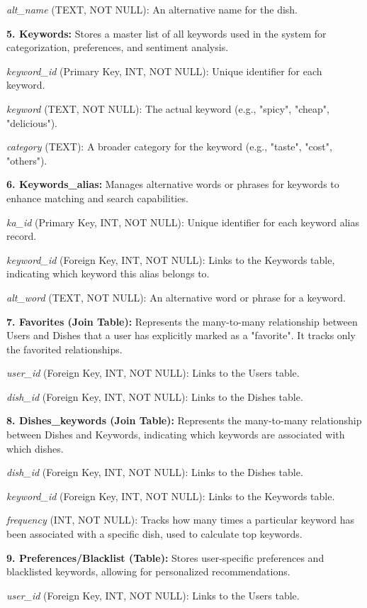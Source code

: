 \textit{alt\_name} (TEXT, NOT NULL): An alternative name for the dish.

\textbf{5. Keywords:} Stores a master list of all keywords used in the system for categorization, preferences, and sentiment analysis.

\textit{keyword\_id} (Primary Key, INT, NOT NULL): Unique identifier for each keyword.

\textit{keyword} (TEXT, NOT NULL): The actual keyword (e.g., "spicy", "cheap", "delicious").

\textit{category} (TEXT): A broader category for the keyword (e.g., "taste", "cost", "others").

\textbf{6. Keywords\_alias:} Manages alternative words or phrases for keywords to enhance matching and search capabilities.

\textit{ka\_id} (Primary Key, INT, NOT NULL): Unique identifier for each keyword alias record.

\textit{keyword\_id} (Foreign Key, INT, NOT NULL): Links to the Keywords table, indicating which keyword this alias belongs to.

\textit{alt\_word} (TEXT, NOT NULL): An alternative word or phrase for a keyword.

\textbf{7. Favorites (Join Table):} Represents the many-to-many relationship between Users and Dishes that a user has explicitly marked as a "favorite". It tracks only the favorited relationships.

\textit{user\_id} (Foreign Key, INT, NOT NULL): Links to the Users table.

\textit{dish\_id} (Foreign Key, INT, NOT NULL): Links to the Dishes table.

\textbf{8. Dishes\_keywords (Join Table):} Represents the many-to-many relationship between Dishes and Keywords, indicating which keywords are associated with which dishes.

\textit{dish\_id} (Foreign Key, INT, NOT NULL): Links to the Dishes table.

\textit{keyword\_id} (Foreign Key, INT, NOT NULL): Links to the Keywords table.

\textit{frequency} (INT, NOT NULL): Tracks how many times a particular keyword has been associated with a specific dish, used to calculate top keywords.

\textbf{9. Preferences/Blacklist (Table):} Stores user-specific preferences and blacklisted keywords, allowing for personalized recommendations.

\textit{user\_id} (Foreign Key, INT, NOT NULL): Links to the Users table.

